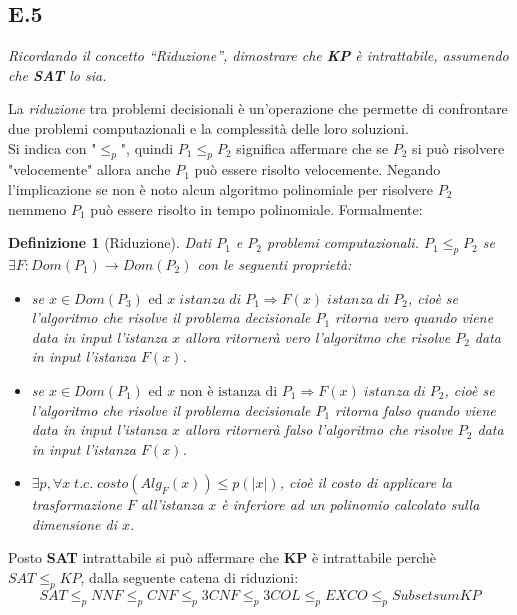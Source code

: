 \documentclass[a4paper]{article}
\newtheorem*{definition}{Definizione}
\newcommand{\red}{\leq_p}
\begin{document}
\subsection{E.5}
\emph{Ricordando il concetto “Riduzione”, dimostrare che \textbf{KP} è intrattabile, assumendo che \textbf{SAT} lo sia.}


La \textit{riduzione} tra problemi decisionali è un'operazione che permette di confrontare due problemi computazionali e la complessità delle loro soluzioni.\\
Si indica con "$\leq_p$", quindi $P_1 \leq_p P_2$ significa affermare che se $P_2$ si può risolvere "velocemente" allora anche $P_1$ può essere risolto velocemente.
Negando l'implicazione se non è noto alcun algoritmo polinomiale per risolvere $P_2$ nemmeno $P_1$ può essere risolto in tempo polinomiale.
Formalmente:
\begin{definition}[Riduzione]
	Dati $P_1$ e $P_2$ problemi computazionali. $P_1 \red P_2$ se $\exists F: Dom(P_1) \rightarrow Dom(P_2)$ con le seguenti proprietà:
	\begin{itemize}
		\item se $x \in Dom(P_3) \text{ ed } x \; istanza \; di \; P_1 \Rightarrow F(x) \; istanza \; di \; P_2$, cioè se l'algoritmo che risolve il problema decisionale $P_1$ ritorna \textit{vero} quando viene data in input l'istanza $x$ allora ritornerà \textit{vero} l'algoritmo che risolve $P_2$ data in input l'istanza $F(x)$.
		\item se $x \in Dom(P_1) \text{ ed } x \text{ non è istanza di }P_1 \Rightarrow F(x) \; istanza \; di \; P_2$, cioè se l'algoritmo che risolve il problema decisionale $P_1$ ritorna \textit{falso} quando viene data in input l'istanza $x$ allora ritornerà \textit{falso} l'algoritmo che risolve $P_2$ data in input l'istanza $F(x)$.
		\item $\exists p, \forall x \; t.c. \; costo(Alg_F(x))\leq p(\lvert x \rvert)$, cioè il costo di applicare la trasformazione $F$ all'istanza $x$ è inferiore ad un polinomio calcolato sulla dimensione di $x$.
	\end{itemize}
\end{definition}
Posto \textbf{SAT} intrattabile si può affermare che \textbf{KP} è intrattabile perchè $SAT \red KP$, dalla seguente catena di riduzioni:
$$ SAT \red NNF \red CNF \red 3CNF \red 3COL \red EXCO \red Subsetsum KP$$
\end{document}
